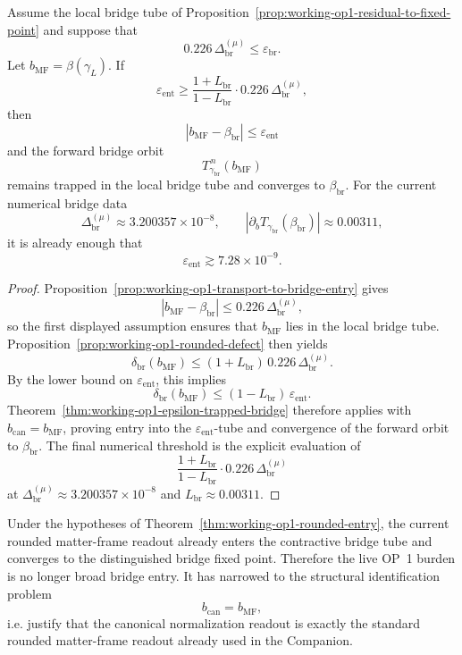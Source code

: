 \begin{theorem}
\label{thm:working-op1-rounded-entry}
Assume the local bridge tube of Proposition~\ref{prop:working-op1-residual-to-fixed-point} and suppose that
\[
  0.226\,\Delta^{(\mu)}_{\mathrm{br}}
  \le
  \varepsilon_{\mathrm{br}}.
\]
Let \(b_{\mathrm{MF}}=\beta(\gamma_L)\). If
\[
  \varepsilon_{\mathrm{ent}}
  \ge
  \frac{1+L_{\mathrm{br}}}{1-L_{\mathrm{br}}}
  \cdot 0.226\,\Delta^{(\mu)}_{\mathrm{br}},
\]
then
\[
  |b_{\mathrm{MF}}-\beta_{\mathrm{br}}|
  \le
  \varepsilon_{\mathrm{ent}}
\]
and the forward bridge orbit
\[
  T_{\gamma_{\mathrm{br}}}^{\,n}(b_{\mathrm{MF}})
\]
remains trapped in the local bridge tube and converges to \(\beta_{\mathrm{br}}\).
For the current numerical bridge data
\[
  \Delta^{(\mu)}_{\mathrm{br}}\approx 3.200357\times10^{-8},
  \qquad
  |\partial_b T_{\gamma_{\mathrm{br}}}(\beta_{\mathrm{br}})|\approx 0.00311,
\]
it is already enough that
\[
  \varepsilon_{\mathrm{ent}}\gtrsim 7.28\times10^{-9}.
\]
\end{theorem}

\begin{proof}
Proposition~\ref{prop:working-op1-transport-to-bridge-entry} gives
\[
  |b_{\mathrm{MF}}-\beta_{\mathrm{br}}|
  \le
  0.226\,\Delta^{(\mu)}_{\mathrm{br}},
\]
so the first displayed assumption ensures that \(b_{\mathrm{MF}}\) lies in the local bridge tube. Proposition~\ref{prop:working-op1-rounded-defect} then yields
\[
  \delta_{\mathrm{br}}(b_{\mathrm{MF}})
  \le
  (1+L_{\mathrm{br}})\,0.226\,\Delta^{(\mu)}_{\mathrm{br}}.
\]
By the lower bound on \(\varepsilon_{\mathrm{ent}}\), this implies
\[
  \delta_{\mathrm{br}}(b_{\mathrm{MF}})
  \le
  (1-L_{\mathrm{br}})\,\varepsilon_{\mathrm{ent}}.
\]
Theorem~\ref{thm:working-op1-epsilon-trapped-bridge} therefore applies with \(b_{\mathrm{can}}=b_{\mathrm{MF}}\), proving entry into the \(\varepsilon_{\mathrm{ent}}\)-tube and convergence of the forward orbit to \(\beta_{\mathrm{br}}\). The final numerical threshold is the explicit evaluation of
\[
  \frac{1+L_{\mathrm{br}}}{1-L_{\mathrm{br}}}
  \cdot 0.226\,\Delta^{(\mu)}_{\mathrm{br}}
\]
at \(\Delta^{(\mu)}_{\mathrm{br}}\approx 3.200357\times10^{-8}\) and \(L_{\mathrm{br}}\approx 0.00311\).
\end{proof}

\begin{corollary}
\label{cor:working-op1-narrowed-live-burden}
Under the hypotheses of Theorem~\ref{thm:working-op1-rounded-entry}, the current rounded matter-frame readout already enters the contractive bridge tube and converges to the distinguished bridge fixed point. Therefore the live OP~1 burden is no longer broad bridge entry. It has narrowed to the structural identification problem
\[
  b_{\mathrm{can}}=b_{\mathrm{MF}},
\]
i.e. justify that the canonical normalization readout is exactly the standard rounded matter-frame readout already used in the Companion.
\end{corollary}

